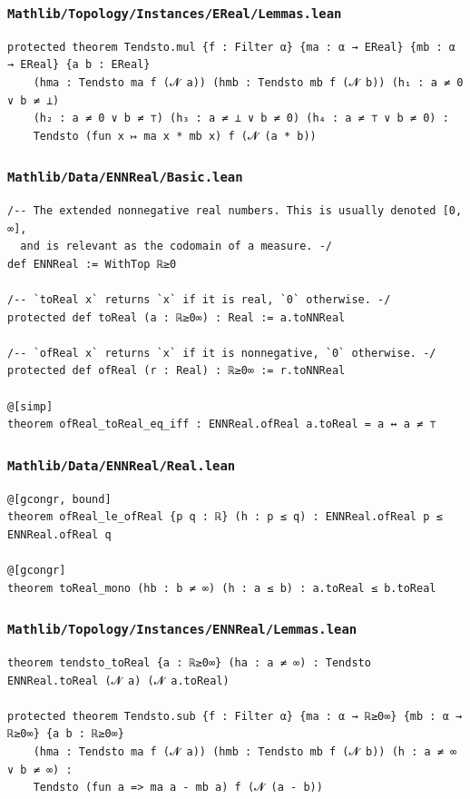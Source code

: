 \subsubsection{\texttt{Mathlib/Topology/Instances/EReal/Lemmas.lean}}
\begin{lstlisting}[language=lean]
protected theorem Tendsto.mul {f : Filter α} {ma : α → EReal} {mb : α → EReal} {a b : EReal}
    (hma : Tendsto ma f (𝓝 a)) (hmb : Tendsto mb f (𝓝 b)) (h₁ : a ≠ 0 ∨ b ≠ ⊥)
    (h₂ : a ≠ 0 ∨ b ≠ ⊤) (h₃ : a ≠ ⊥ ∨ b ≠ 0) (h₄ : a ≠ ⊤ ∨ b ≠ 0) :
    Tendsto (fun x ↦ ma x * mb x) f (𝓝 (a * b))
\end{lstlisting}

\subsubsection{\texttt{Mathlib/Data/ENNReal/Basic.lean}}
\begin{lstlisting}[language=lean]
/-- The extended nonnegative real numbers. This is usually denoted [0, ∞],
  and is relevant as the codomain of a measure. -/
def ENNReal := WithTop ℝ≥0

/-- `toReal x` returns `x` if it is real, `0` otherwise. -/
protected def toReal (a : ℝ≥0∞) : Real := a.toNNReal

/-- `ofReal x` returns `x` if it is nonnegative, `0` otherwise. -/
protected def ofReal (r : Real) : ℝ≥0∞ := r.toNNReal

@[simp]
theorem ofReal_toReal_eq_iff : ENNReal.ofReal a.toReal = a ↔ a ≠ ⊤
\end{lstlisting}

\newpage
\subsubsection{\texttt{Mathlib/Data/ENNReal/Real.lean}}
\begin{lstlisting}[language=lean]
@[gcongr, bound]
theorem ofReal_le_ofReal {p q : ℝ} (h : p ≤ q) : ENNReal.ofReal p ≤ ENNReal.ofReal q

@[gcongr]
theorem toReal_mono (hb : b ≠ ∞) (h : a ≤ b) : a.toReal ≤ b.toReal
\end{lstlisting}

\subsubsection{\texttt{Mathlib/Topology/Instances/ENNReal/Lemmas.lean}}
\begin{lstlisting}[language=lean]
theorem tendsto_toReal {a : ℝ≥0∞} (ha : a ≠ ∞) : Tendsto ENNReal.toReal (𝓝 a) (𝓝 a.toReal)

protected theorem Tendsto.sub {f : Filter α} {ma : α → ℝ≥0∞} {mb : α → ℝ≥0∞} {a b : ℝ≥0∞}
    (hma : Tendsto ma f (𝓝 a)) (hmb : Tendsto mb f (𝓝 b)) (h : a ≠ ∞ ∨ b ≠ ∞) :
    Tendsto (fun a => ma a - mb a) f (𝓝 (a - b))
\end{lstlisting}

